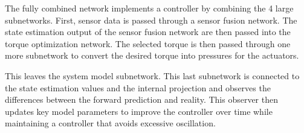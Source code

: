 
The fully combined network implements
a controller by combining the 4 large subnetworks. First, sensor data is passed
through a sensor fusion network. The state estimation output of the sensor 
fusion network are then passed into the torque optimization network. The 
selected torque is then passed through one more subnetwork to convert the
desired torque into pressures for the actuators.

This leaves the system model subnetwork. This last subnetwork is connected to 
the state estimation values and the internal projection and observes the 
differences between the forward prediction and reality. This observer then 
updates key model parameters to improve the controller over time while 
maintaining a controller that avoids excessive oscillation. 
